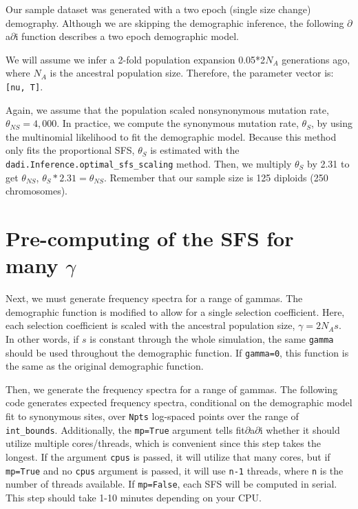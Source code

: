 \documentclass[11pt]{article}
\begin{document}
Our sample dataset was generated with a two epoch (single size change) demography. Although we are skipping the demographic inference, the following $\partial$a$\partial$i function describes a two epoch demographic model.



We will assume we infer a 2-fold population expansion 0.05*2$N_A$ generations ago, where $N_A$ is the ancestral population size. Therefore, the parameter vector is: \texttt{[nu, T]}.



Again, we assume that the population scaled nonsynonymous mutation rate, $\theta_{NS}=4,000$. In practice, we compute the synonymous mutation rate, $\theta_S$, by using the multinomial likelihood to fit the demographic model. Because this method only fits the proportional SFS, $\theta_S$ is estimated with the \texttt{dadi.Inference.optimal\_sfs\_scaling} method. Then, we multiply $\theta_S$ by 2.31 to get $\theta_{NS}$, $\theta_S * 2.31 = \theta_{NS}$. Remember that our sample size is 125 diploids (250 chromosomes).



\section{Pre-computing of the SFS for many $\gamma$}

Next, we must generate frequency spectra for a range of gammas. The demographic function is modified to allow for a single selection coefficient. Here, each selection coefficient is scaled with the ancestral population size, $\gamma=2N_As$. In other words, if $s$ is constant through the whole simulation, the same \texttt{gamma} should be used throughout the demographic function. If \texttt{gamma=0}, this function is the same as the original demographic function. 



Then, we generate the frequency spectra for a range of gammas. The following code generates expected frequency spectra, conditional on the demographic model fit to synonymous sites, over \texttt{Npts} log-spaced points over the range of \texttt{int\_bounds}. Additionally, the \texttt{mp=True} argument tells fit$\partial$a$\partial$i whether it should utilize multiple cores/threads, which is convenient since this step takes the longest. If the argument \texttt{cpus} is passed, it will utilize that many cores, but if \texttt{mp=True} and no \texttt{cpus} argument is passed, it will use \texttt{n-1} threads, where \texttt{n} is the number of threads available. If \texttt{mp=False}, each SFS will be computed in serial. This step should take 1-10 minutes depending on your CPU.
\end{document}
